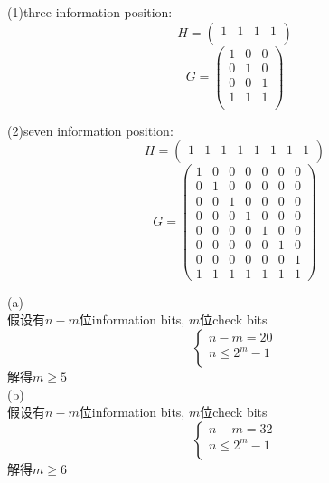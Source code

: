 \documentclass[a4paper, justified]{tufte-handout}
\begin{document}
\begin{solution}
(1)three information position:\\
 $$H=\begin{pmatrix}1&1&1&1\\
 \end{pmatrix}$$
 $$G=\begin{pmatrix}1&0&0\\
			   0&1&0\\
			   0&0&1\\
			   1&1&1\\
 \end{pmatrix}$$
 
 \noindent (2)seven information position:\\
  $$H=\begin{pmatrix}1&1&1&1&1&1&1&1\\
 \end{pmatrix}$$
 $$G=\begin{pmatrix}1&0&0&0&0&0&0\\
			   0&1&0&0&0&0&0\\
			   0&0&1&0&0&0&0\\
			   0&0&0&1&0&0&0\\
			   0&0&0&0&1&0&0\\
			   0&0&0&0&0&1&0\\
			   0&0&0&0&0&0&1\\
			   1&1&1&1&1&1&1
			   \end{pmatrix}$$		 
\end{solution}

\begin{problem}[TJ 8-23]
\end{problem}

\begin{solution}
(a)\\
假设有$n-m$位information bits, $m$位check bits
$$ \left\{
\begin{aligned}
n-m =  20 \\
n \leq 2^ m - 1 \\
\end{aligned}
\right.
$$
解得$m\geq 5$\\
(b)\\
假设有$n-m$位information bits, $m$位check bits
$$ \left\{
\begin{aligned}
n-m =  32 \\
n \leq 2^ m - 1 \\
\end{aligned}
\right.
$$
解得$m\geq 6$
\end{solution}
\end{document}

